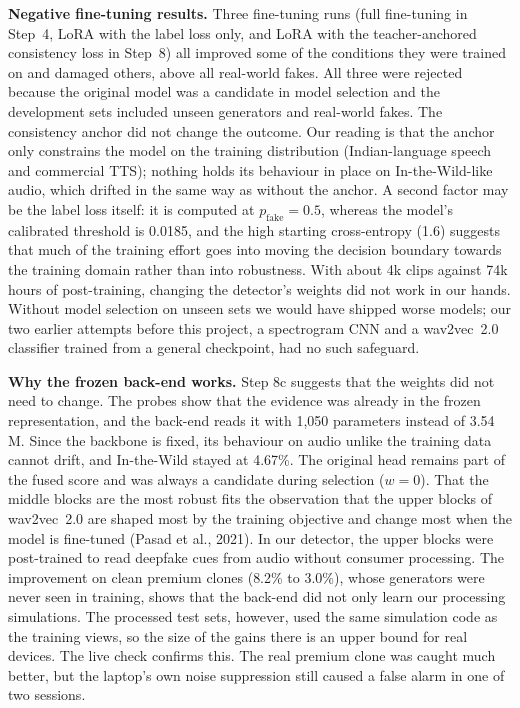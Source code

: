 \documentclass[10pt,a4paper,twocolumn]{article}
\begin{document}
\textbf{Negative fine-tuning results.} Three fine-tuning runs (full fine-tuning in Step~4, LoRA with the label loss only, and LoRA with the teacher-anchored consistency loss in Step~8) all improved some of the conditions they were trained on and damaged others, above all real-world fakes. All three were rejected because the original model was a candidate in model selection and the development sets included unseen generators and real-world fakes. The consistency anchor did not change the outcome. Our reading is that the anchor only constrains the model on the training distribution (Indian-language speech and commercial TTS); nothing holds its behaviour in place on In-the-Wild-like audio, which drifted in the same way as without the anchor. A second factor may be the label loss itself: it is computed at $p_{\text{fake}}=0.5$, whereas the model's calibrated threshold is 0.0185, and the high starting cross-entropy (1.6) suggests that much of the training effort goes into moving the decision boundary towards the training domain rather than into robustness. With about 4k clips against 74k hours of post-training, changing the detector's weights did not work in our hands. Without model selection on unseen sets we would have shipped worse models; our two earlier attempts before this project, a spectrogram CNN and a wav2vec~2.0 classifier trained from a general checkpoint, had no such safeguard.

\textbf{Why the frozen back-end works.} Step 8c suggests that the weights did not need to change. The probes show that the evidence was already in the frozen representation, and the back-end reads it with 1,050 parameters instead of 3.54\,M. Since the backbone is fixed, its behaviour on audio unlike the training data cannot drift, and In-the-Wild stayed at 4.67\%. The original head remains part of the fused score and was always a candidate during selection ($w=0$). That the middle blocks are the most robust fits the observation that the upper blocks of wav2vec~2.0 are shaped most by the training objective and change most when the model is fine-tuned (Pasad et al., 2021). In our detector, the upper blocks were post-trained to read deepfake cues from audio without consumer processing. The improvement on clean premium clones (8.2\% to 3.0\%), whose generators were never seen in training, shows that the back-end did not only learn our processing simulations. The processed test sets, however, used the same simulation code as the training views, so the size of the gains there is an upper bound for real devices. The live check confirms this. The real premium clone was caught much better, but the laptop's own noise suppression still caused a false alarm in one of two sessions.
\end{document}
